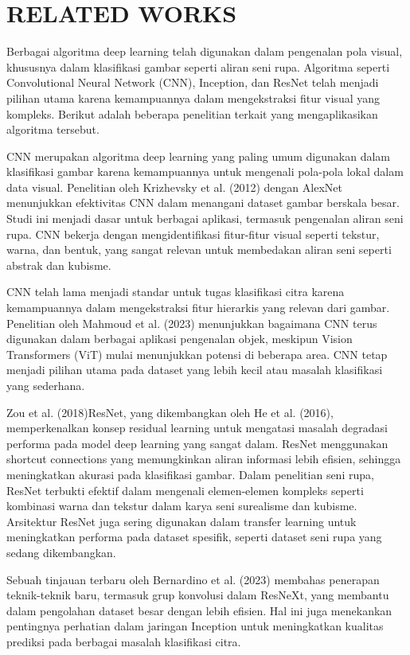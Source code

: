 \documentclass[12pt,a4paper]{article}
\begin{document}
\section{RELATED WORKS}
\begin{adjustwidth}{3em}{0pt} 
\hspace{0.5cm} Berbagai algoritma deep learning telah digunakan dalam pengenalan pola visual, khususnya dalam klasifikasi gambar seperti aliran seni rupa. Algoritma seperti Convolutional Neural Network (CNN), Inception, dan ResNet telah menjadi pilihan utama karena kemampuannya dalam mengekstraksi fitur visual yang kompleks. Berikut adalah beberapa penelitian terkait yang mengaplikasikan algoritma tersebut.


\hspace{0.5cm} CNN merupakan algoritma deep learning yang paling umum digunakan dalam klasifikasi gambar karena kemampuannya untuk mengenali pola-pola lokal dalam data visual. Penelitian oleh Krizhevsky et al. (2012) dengan AlexNet menunjukkan efektivitas CNN dalam menangani dataset gambar berskala besar. Studi ini menjadi dasar untuk berbagai aplikasi, termasuk pengenalan aliran seni rupa. CNN bekerja dengan mengidentifikasi fitur-fitur visual seperti tekstur, warna, dan bentuk, yang sangat relevan untuk membedakan aliran seni seperti abstrak dan kubisme.

\hspace{0.5cm} CNN telah lama menjadi standar untuk tugas klasifikasi citra karena kemampuannya dalam mengekstraksi fitur hierarkis yang relevan dari gambar. Penelitian oleh Mahmoud et al. (2023) menunjukkan bagaimana CNN terus digunakan dalam berbagai aplikasi pengenalan objek, meskipun Vision Transformers (ViT) mulai menunjukkan potensi di beberapa area. CNN tetap menjadi pilihan utama pada dataset yang lebih kecil atau masalah klasifikasi yang sederhana.

\hspace{0.5cm} Zou et al. (2018)ResNet, yang dikembangkan oleh He et al. (2016), memperkenalkan konsep residual learning untuk mengatasi masalah degradasi performa pada model deep learning yang sangat dalam. ResNet menggunakan shortcut connections yang memungkinkan aliran informasi lebih efisien, sehingga meningkatkan akurasi pada klasifikasi gambar. Dalam penelitian seni rupa, ResNet terbukti efektif dalam mengenali elemen-elemen kompleks seperti kombinasi warna dan tekstur dalam karya seni surealisme dan kubisme. Arsitektur ResNet juga sering digunakan dalam transfer learning untuk meningkatkan performa pada dataset spesifik, seperti dataset seni rupa yang sedang dikembangkan.

\hspace{0.5cm} Sebuah tinjauan terbaru oleh Bernardino et al. (2023) membahas penerapan teknik-teknik baru, termasuk grup konvolusi dalam ResNeXt, yang membantu dalam pengolahan dataset besar dengan lebih efisien. Hal ini juga menekankan pentingnya perhatian dalam jaringan Inception untuk meningkatkan kualitas prediksi pada berbagai masalah klasifikasi citra.

\end{adjustwidth}
\end{document}
